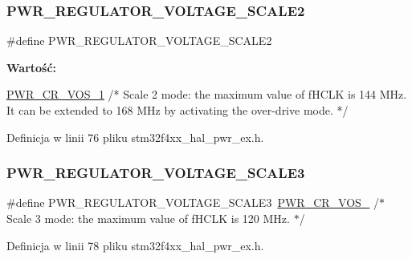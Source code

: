 \subsubsection{\texorpdfstring{P\+W\+R\+\_\+\+R\+E\+G\+U\+L\+A\+T\+O\+R\+\_\+\+V\+O\+L\+T\+A\+G\+E\+\_\+\+S\+C\+A\+L\+E2}{PWR\_REGULATOR\_VOLTAGE\_SCALE2}}
{\footnotesize\ttfamily \#define P\+W\+R\+\_\+\+R\+E\+G\+U\+L\+A\+T\+O\+R\+\_\+\+V\+O\+L\+T\+A\+G\+E\+\_\+\+S\+C\+A\+L\+E2}

{\bfseries Wartość\+:}
\begin{DoxyCode}
\hyperlink{group___peripheral___registers___bits___definition_gac3093c26b256c965cebec3b2e388a3b4}{PWR\_CR\_VOS\_1}           \textcolor{comment}{/* Scale 2 mode: the maximum value of fHCLK is 144 MHz. It can be
       extended to}
\textcolor{comment}{                                                                       168 MHz by activating the over-drive
       mode. */}
\end{DoxyCode}


Definicja w linii 76 pliku stm32f4xx\+\_\+hal\+\_\+pwr\+\_\+ex.\+h.

\mbox{\label{group___p_w_r_ex___regulator___voltage___scale_gabed272232ad95f663da2a758834d0ba9}} 
\subsubsection{\texorpdfstring{P\+W\+R\+\_\+\+R\+E\+G\+U\+L\+A\+T\+O\+R\+\_\+\+V\+O\+L\+T\+A\+G\+E\+\_\+\+S\+C\+A\+L\+E3}{PWR\_REGULATOR\_VOLTAGE\_SCALE3}}
{\footnotesize\ttfamily \#define P\+W\+R\+\_\+\+R\+E\+G\+U\+L\+A\+T\+O\+R\+\_\+\+V\+O\+L\+T\+A\+G\+E\+\_\+\+S\+C\+A\+L\+E3~\hyperlink{group___peripheral___registers___bits___definition_ga27b4e08a8936aa9828c5d683fde2fb59}{P\+W\+R\+\_\+\+C\+R\+\_\+\+V\+O\+S\+\_}           /$\ast$ Scale 3 mode\+: the maximum value of f\+H\+C\+LK is 120 M\+Hz. $\ast$/}



Definicja w linii 78 pliku stm32f4xx\+\_\+hal\+\_\+pwr\+\_\+ex.\+h.

